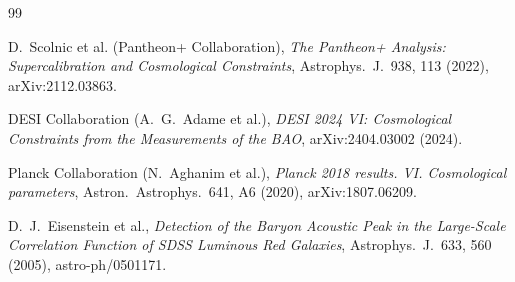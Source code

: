 \documentclass[10pt,a4paper,twocolumn]{article}
\begin{document}

\begin{thebibliography}{99}

D.~Scolnic et al. (Pantheon+ Collaboration),
\emph{The Pantheon+ Analysis: Supercalibration and Cosmological Constraints},
Astrophys.~J.~938, 113 (2022), arXiv:2112.03863.

DESI Collaboration (A.~G.~Adame et al.),
\emph{DESI 2024 VI: Cosmological Constraints from the Measurements of the BAO},
arXiv:2404.03002 (2024).

Planck Collaboration (N.~Aghanim et al.),
\emph{Planck 2018 results. VI. Cosmological parameters},
Astron.~Astrophys.~641, A6 (2020), arXiv:1807.06209.

D.~J.~Eisenstein et al.,
\emph{Detection of the Baryon Acoustic Peak in the Large-Scale Correlation Function of SDSS Luminous Red Galaxies},
Astrophys.~J.~633, 560 (2005), astro-ph/0501171.

\end{thebibliography}
\end{document}
